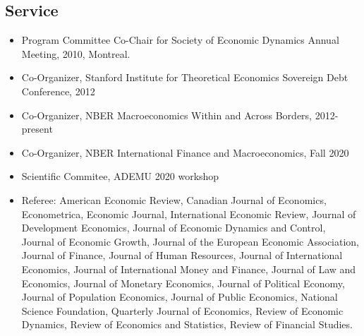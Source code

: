 \documentclass[12pt]{article}
\begin{document}




 \subsection*{Service}

 \begin{itemize}[left=0pt .. \parindent, label=]

\item Program Committee Co-Chair for Society of Economic Dynamics Annual
 Meeting, 2010, Montreal.

 \item Co-Organizer, Stanford Institute for Theoretical Economics Sovereign
 Debt Conference, 2012
 
 \item Co-Organizer, NBER Macroeconomics Within and Across Borders,
 2012-present
 
 \item Co-Organizer, NBER International Finance and Macroeconomics,
 Fall 2020
  
 \item Scientific Commitee, ADEMU 2020 workshop

      
 \item Referee: American Economic Review, Canadian Journal of Economics,
 Econometrica, Economic Journal, International Economic Review, Journal
 of Development Economics, Journal of Economic Dynamics and Control,
 Journal of Economic Growth, Journal of the European Economic
 Association, Journal of Finance, Journal of Human Resources, Journal of
 International Economics, Journal of International Money and Finance,
 Journal of Law and Economics, Journal of Monetary Economics, Journal of
 Political Economy, Journal of Population Economics, Journal of Public
 Economics, National Science Foundation, Quarterly Journal of Economics,
 Review of Economic Dynamics, Review of Economics and Statistics, Review
 of Financial Studies.
 
\end{itemize}
\end{document}
